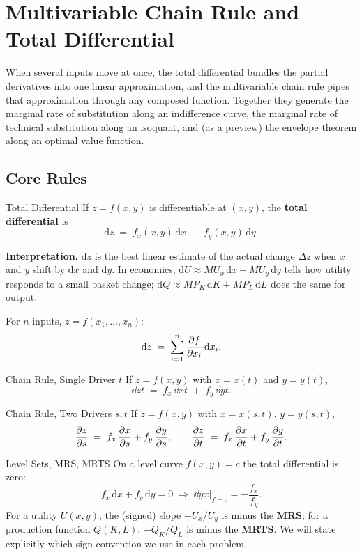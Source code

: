 \chapter{Multivariable Chain Rule and Total Differential}

When several inputs move at once, the total differential bundles the partial
derivatives into one linear approximation, and the multivariable chain rule
pipes that approximation through any composed function. Together they
generate the marginal rate of substitution along an indifference curve, the
marginal rate of technical substitution along an isoquant, and (as a
preview) the envelope theorem along an optimal value function.

\section{Core Rules}

\begin{rulebox}{Total Differential}
If $z=f(x,y)$ is differentiable at $(x,y)$, the \textbf{total differential}
is
\[
  \mathrm{d}z \;=\; f_{x}(x,y)\,\mathrm{d}x \;+\; f_{y}(x,y)\,\mathrm{d}y .
\]

\textbf{Interpretation.} $\mathrm{d}z$ is the best linear estimate of the
actual change $\Delta z$ when $x$ and $y$ shift by $\mathrm{d}x$ and
$\mathrm{d}y$. In economics, $\mathrm{d}U \approx MU_{x}\,\mathrm{d}x +
MU_{y}\,\mathrm{d}y$ tells how utility responds to a small basket change;
$\mathrm{d}Q \approx MP_{K}\,\mathrm{d}K + MP_{L}\,\mathrm{d}L$ does the same
for output.

For $n$ inputs, $z=f(x_{1},\ldots,x_{n})$:
\[
  \mathrm{d}z \;=\; \sum_{i=1}^{n} \frac{\partial f}{\partial x_{i}}\,\mathrm{d}x_{i} .
\]
\end{rulebox}

\begin{rulebox}{Chain Rule, Single Driver $t$}
If $z=f(x,y)$ with $x=x(t)$ and $y=y(t)$,
\[
  \dd{z}{t} \;=\; f_{x}\,\dd{x}{t} \;+\; f_{y}\,\dd{y}{t} .
\]
\end{rulebox}

\begin{rulebox}{Chain Rule, Two Drivers $s,t$}
If $z=f(x,y)$ with $x=x(s,t)$, $y=y(s,t)$,
\[
  \frac{\partial z}{\partial s} \;=\; f_{x}\,\frac{\partial x}{\partial s} + f_{y}\,\frac{\partial y}{\partial s},\qquad
  \frac{\partial z}{\partial t} \;=\; f_{x}\,\frac{\partial x}{\partial t} + f_{y}\,\frac{\partial y}{\partial t} .
\]
\end{rulebox}

\begin{rulebox}{Level Sets, MRS, MRTS}
On a level curve $f(x,y)=c$ the total differential is zero:
\[
  f_{x}\,\mathrm{d}x + f_{y}\,\mathrm{d}y = 0
  \;\Longrightarrow\;
  \dd{y}{x}\bigg|_{f=c} = -\frac{f_{x}}{f_{y}} .
\]
For a utility $U(x,y)$, the (signed) slope $-U_{x}/U_{y}$ is minus the
\textbf{MRS}; for a production function $Q(K,L)$, $-Q_{K}/Q_{L}$ is minus
the \textbf{MRTS}. We will state explicitly which sign convention we use in
each problem.
\end{rulebox}


